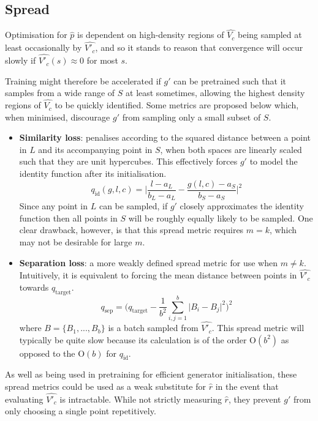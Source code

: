 \documentclass[../../main.tex]{subfiles}
\begin{document}
\subsection{Spread} \label{subsection:spread}

Optimisation for $\hat{p}$ is dependent on high-density regions of $\hat{V_c}$ being sampled at least occasionally by $\hat{V'_c}$, and so it stands to reason that convergence will occur slowly if $\hat{V'_c}(s)\approx 0$ for most $s$.

Training might therefore be accelerated if $g'$ can be pretrained such that it samples from a wide range of $S$ at least sometimes, allowing the highest density regions of $\hat{V_c}$ to be quickly identified.
Some metrics are proposed below which, when minimised, discourage $g'$ from sampling only a small subset of $S$.
\begin{itemize}
    \item[] \textbf{Similarity loss}: penalises according to the squared distance between a point in $L$ and its accompanying point in $S$, when both spaces are linearly scaled such that they are unit hypercubes.
    This effectively forces $g'$ to model the identity function after its initialisation.
    \begin{equation}
        q_\text{id}(g,l,c)=\bigg|\frac{l-a_L}{b_L-a_L}-\frac{g(l,c)-a_S}{b_S-a_S}\bigg|^2
    \end{equation}
    Since any point in $L$ can be sampled, if $g'$ closely approximates the identity function then all points in $S$ will be roughly equally likely to be sampled.
    One clear drawback, however, is that this spread metric requires $m=k$, which may not be desirable for large $m$.
    \item[] \textbf{Separation loss}: a more weakly defined spread metric for use when $m\neq k$.
    Intuitively, it is equivalent to forcing the mean distance between points in $\hat{V'_c}$ towards $q_\text{target}$. 
    \begin{equation}
        q_\text{sep}=\bigg(q_\text{target}-\frac{1}{b^2}\sum_{i,j=1}^b\big|B_i-B_j\big|^2\bigg)^2
    \end{equation}
    where $B=\{B_1,...,B_b\}$ is a batch sampled from $\hat{V'_c}$.
    This spread metric will typically be quite slow because its calculation is of the order $\text{O}(b^2)$ as opposed to the $\text{O}(b)$ for $q_\text{id}$.
\end{itemize}
As well as being used in pretraining for efficient generator initialisation, these spread metrics could be used as a weak substitute for $\hat{r}$ in the event that evaluating $\hat{V'_c}$ is intractable.
While not strictly measuring $\hat{r}$, they prevent $g'$ from only choosing a single point repetitively.
\end{document}

